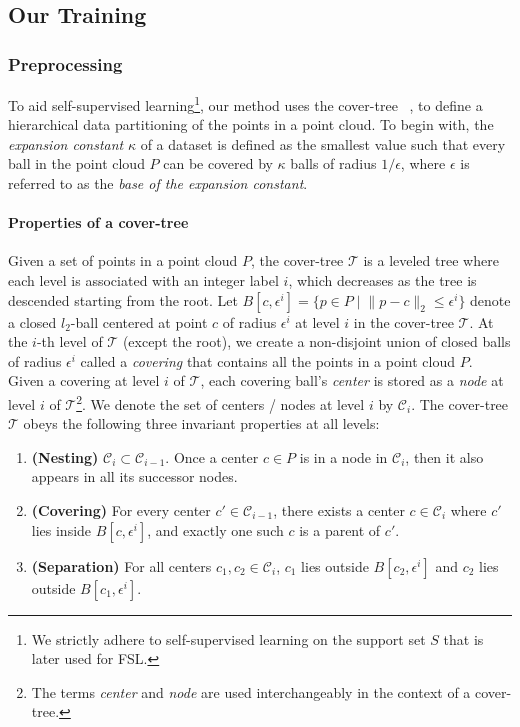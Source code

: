 \documentclass{article}
\newcommand{\mC}{\mathcal{C}}
\newcommand{\mT}{\mathcal{T}}
\begin{document}
\subsection{Our Training}
\label{subsec:training}
\subsubsection{Preprocessing}
\label{ssec:preproc}
To aid self-supervised learning\footnote{We strictly adhere to self-supervised learning on the support set $S$ that is later used for FSL.}, our method uses the cover-tree~\cite{beygelzimer2006cover} , to define a hierarchical data partitioning of the points in a point cloud. 
To begin with, the \emph{expansion constant} $\kappa$ of a dataset is defined as the smallest value such that every ball in the point cloud $P$ can be covered by $\kappa$ balls of radius $1/ \epsilon$, where $\epsilon$ is referred to as the \emph{base of the expansion constant}.
\paragraph{Properties of a cover-tree~\cite{beygelzimer2006cover}} Given a set of points in a point cloud $P$, the cover-tree $\mathcal{T}$ is a leveled tree where each level is associated with an integer label $i$, which decreases as the tree is descended starting from the root. 
Let $B[c, \epsilon^i ] = \{ p \in P \mid \lVert p - c \rVert_2 \leq \epsilon^i \}$ denote a closed $l_2$-ball centered at point $c$ of radius $\epsilon^i$ at level $i$ in the cover-tree $\mT$.
At the $i$-th level of $\mT$ (except the root), we create a non-disjoint union of closed balls of radius $\epsilon^i$ 
called a \emph{covering} that contains all the points in a point cloud $P$. Given a covering at level $i$ of $\mT$, each covering ball's \emph{center} is stored as a \emph{node} at level $i$ of $\mT$\footnote{The terms \emph{center} and \emph{node} are used interchangeably in the context of a cover-tree.}.
We denote the set of centers / nodes at level $i$ by $\mC_i$. 
The cover-tree $\mathcal{T}$ obeys the following three invariant properties at all levels:
\begin{enumerate}
	\setlength{\parskip}{0cm}
	\setlength{\itemsep}{0cm}
 	
 	\item \textbf{(Nesting)} $\mathcal{C}_{i} \subset \mathcal{C}_{i-1}$. Once a center $c \in P$ is in a node in $\mathcal{C}_{i}$, then it also appears in all its successor nodes.
 	\item \textbf{(Covering)} For every center $c' \in \mathcal{C}_{i-1}$, there exists a center $c \in \mathcal{C}_{i}$ where $c'$ lies inside $B[c, \epsilon^i ]$, and exactly one such $c$ is a parent of $c'$.
 	\item \textbf{(Separation)} For all centers $c_{1},c_{2} \in \mathcal{C}_{i}$, $c_{1}$ lies outside 
 	$B[c_2, \epsilon^i ]$ and $c_{2}$ lies outside $B[c_1, \epsilon^i ]$.
\end{enumerate}
\fi
\end{document}
